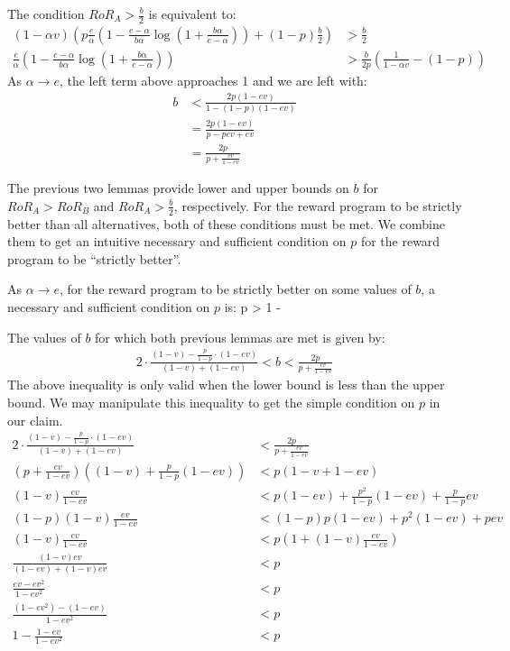 \proof
The condition $RoR_A > \frac{b}{2}$ is equivalent to:
\begin{align*}
(1-\alpha v)\left(p \frac{e}{\alpha}\left(1-\frac{e-\alpha}{b\alpha}\log \left(1+\frac{b\alpha}{e-\alpha} \right) \right)+(1-p)\frac{b}{2}\right) &> \frac{b}{2} \\
\frac{e}{\alpha} \left(1-\frac{e-\alpha}{b\alpha}\log \left(1+\frac{b\alpha}{e-\alpha} \right) \right) &> \frac{b}{2p}\left(\frac{1}{1-\alpha v}-(1-p) \right)
\end{align*}
As $\alpha \rightarrow e$, the left term above approaches 1 and we are left with:
\begin{align*}
b &< \frac{2 p (1-ev)}{1-(1-p)(1-ev)} \\
&= \frac{2p(1-ev)}{p-pev+ev} \\
&= \frac{2p}{p+\frac{ev}{1-ev}}
\end{align*}
\endproof

The previous two lemmas provide lower and upper bounds on $b$ for $RoR_A > RoR_B$ and $RoR_A > \frac{b}{2}$, respectively. For the reward program to be strictly better than all alternatives, both of these conditions must be met. We combine them to get an intuitive necessary and sufficient condition on $p$ for the reward program to be ``strictly better''. 

\begin{lemma}
As $\alpha \rightarrow e$, for the reward program to be strictly better on some values of $b$, a necessary and sufficient condition on $p$ is:
\beq
\label{eq:necp}
p > 1 - 
\eeq
\end{lemma}

\proof
 The values of $b$ for which both previous lemmas are met is given by:
\begin{align*}
2\cdot \frac{(1-v) - \frac{p}{1-p}\cdot (1-ev)}{(1-v) + (1-ev)} < b < \frac{2p}{p+\frac{ev}{1-ev}}
\end{align*}
The above inequality is only valid when the lower bound is less than the upper bound. We may manipulate this inequality to get the simple condition on $p$ in our claim.
\begin{align*}
2\cdot \frac{(1-v) - \frac{p}{1-p}\cdot (1-ev)}{(1-v) + (1-ev)} &< \frac{2p}{p+\frac{ev}{1-ev}} \\
\left(p+\frac{ev}{1-ev} \right)\left((1-v)+\frac{p}{1-p}(1-ev) \right) &<  p(1-v+1-ev) \\
(1-v)\frac{ev}{1-ev} &< p(1-ev)+\frac{p^2}{1-p}(1-ev) + \frac{p}{1-p}ev \\
(1-p)(1-v)\frac{ev}{1-ev} &< (1-p)p(1-ev)+p^2(1-ev)+pev \\
(1-v)\frac{ev}{1-ev} &< p\left(1+(1-v)\frac{ev}{1-ev} \right) \\
\frac{(1-v)ev}{(1-ev)+(1-v)ev} &< p \\
\frac{ev-ev^2}{1-ev^2} &< p \\
\frac{(1-ev^2)-(1-ev)}{1-ev^2} &< p \\
1-\frac{1-ev}{1-ev^2} &< p
\end{align*}
\endproof

